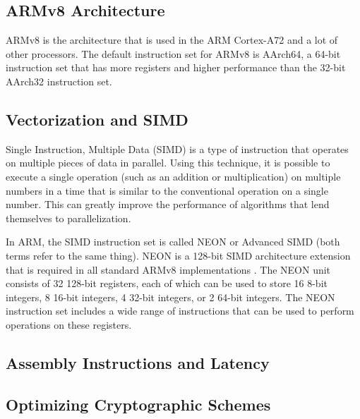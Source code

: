 \documentclass[11pt,a4paper]{report}
\theoremstyle{definition}
\begin{document}
\subsection{ARMv8 Architecture}
ARMv8 is the architecture that is used in the ARM Cortex-A72 and a lot of other processors. The default instruction set for ARMv8 is AArch64, a 64-bit instruction set that has more registers and higher performance than the 32-bit AArch32 instruction set.

\subsection{Vectorization and SIMD}
Single Instruction, Multiple Data (SIMD) is a type of instruction that operates on multiple pieces of data in parallel. Using this technique, it is possible to execute a single operation (such as an addition or multiplication) on multiple numbers in a time that is similar to the conventional operation on a single number. This can greatly improve the performance of algorithms that lend themselves to parallelization.

In ARM, the SIMD instruction set is called NEON or Advanced SIMD (both terms refer to the same thing). NEON is a 128-bit SIMD architecture extension that is required in all standard ARMv8 implementations \cite{ARMv8A-ProgrammersGuide}. The NEON unit consists of 32 128-bit registers, each of which can be used to store 16 8-bit integers, 8 16-bit integers, 4 32-bit integers, or 2 64-bit integers. The NEON instruction set includes a wide range of instructions that can be used to perform operations on these registers.


\subsection{Assembly Instructions and Latency}

\subsection{Optimizing Cryptographic Schemes}
\end{document}
